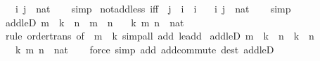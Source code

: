 \begin{isabellebody}
\ \ \ i\ j\ {\isacharcolon}{\kern0pt}{\isacharcolon}{\kern0pt}\ nat\isanewline
%
\isadelimproof
\ \ %
\endisadelimproof
%
\isatagproof
{}\isamarkupfalse%
\ simp%
\endisatagproof
{\isafoldproof}%
%
\isadelimproof
\isanewline
%
\endisadelimproof
\isanewline
{}\isamarkupfalse%
\ not{\isacharunderscore}{\kern0pt}add{\isacharunderscore}{\kern0pt}less{}\ {\isacharbrackleft}{\kern0pt}iff{\isacharbrackright}{\kern0pt}{\isacharcolon}{\kern0pt}\ {\isachardoublequoteopen}{\isasymnot}\ j\ {\isacharplus}{\kern0pt}\ i\ {\isacharless}{\kern0pt}\ i{\isachardoublequoteclose}\isanewline
\ \ \ i\ j\ {\isacharcolon}{\kern0pt}{\isacharcolon}{\kern0pt}\ nat\isanewline
%
\isadelimproof
\ \ %
\endisadelimproof
%
\isatagproof
{}\isamarkupfalse%
\ simp%
\endisatagproof
{\isafoldproof}%
%
\isadelimproof
\isanewline
%
\endisadelimproof
\isanewline
{}\isamarkupfalse%
\ add{\isacharunderscore}{\kern0pt}leD{}{\isacharcolon}{\kern0pt}\ {\isachardoublequoteopen}m\ {\isacharplus}{\kern0pt}\ k\ {\isasymle}\ n\ {\isasymLongrightarrow}\ m\ {\isasymle}\ n{\isachardoublequoteclose}\isanewline
\ \ \ k\ m\ n\ {\isacharcolon}{\kern0pt}{\isacharcolon}{\kern0pt}\ nat\isanewline
%
\isadelimproof
\ \ %
\endisadelimproof
%
\isatagproof
{}\isamarkupfalse%
\ {\isacharparenleft}{\kern0pt}rule\ order{\isacharunderscore}{\kern0pt}trans\ {\isacharbrackleft}{\kern0pt}of\ {\isacharunderscore}{\kern0pt}\ {\isachardoublequoteopen}m\ {\isacharplus}{\kern0pt}\ k{\isachardoublequoteclose}{\isacharbrackright}{\kern0pt}{\isacharparenright}{\kern0pt}\ {\isacharparenleft}{\kern0pt}simp{\isacharunderscore}{\kern0pt}all\ add{\isacharcolon}{\kern0pt}\ le{\isacharunderscore}{\kern0pt}add{}{\isacharparenright}{\kern0pt}%
\endisatagproof
{\isafoldproof}%
%
\isadelimproof
\isanewline
%
\endisadelimproof
\isanewline
{}\isamarkupfalse%
\ add{\isacharunderscore}{\kern0pt}leD{}{\isacharcolon}{\kern0pt}\ {\isachardoublequoteopen}m\ {\isacharplus}{\kern0pt}\ k\ {\isasymle}\ n\ {\isasymLongrightarrow}\ k\ {\isasymle}\ n{\isachardoublequoteclose}\isanewline
\ \ \ k\ m\ n\ {\isacharcolon}{\kern0pt}{\isacharcolon}{\kern0pt}\ nat\isanewline
%
\isadelimproof
\ \ %
\endisadelimproof
%
\isatagproof
{}\isamarkupfalse%
\ {\isacharparenleft}{\kern0pt}force\ simp\ add{\isacharcolon}{\kern0pt}\ add{\isachardot}{\kern0pt}commute\ dest{\isacharcolon}{\kern0pt}\ add{\isacharunderscore}{\kern0pt}leD{}{\isacharparenright}{\kern0pt}%

\end{isabellebody}
